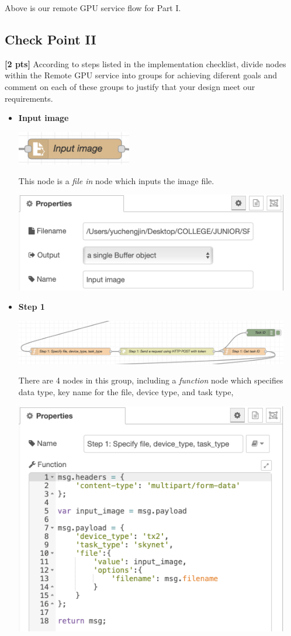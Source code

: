 \documentclass{mcmthesis}
\begin{document}
Above is our remote GPU service flow for Part I.

\subsection{Check Point II}
\textbf{[2 pts]} According to steps listed in the implementation checklist, divide nodes within the Remote GPU service into groups for achieving diferent goals and comment on each of these groups to justify that your design meet our requirements.
\begin{itemize}
\item \textbf{Input image}
\begin{center}
\includegraphics[width=5cm]{1.png}
\end{center}
This node is a \textit{file in} node which inputs the image file.
\begin{center}
\includegraphics[width=12cm]{1_1.png}
\end{center}
\item \textbf{Step 1}
\begin{center}
\includegraphics[width=12cm]{2.png}
\end{center}
There are 4 nodes in this group, including a \textit{function} node which specifies data type, key name for the file, device type, and task type,
\begin{center}
\includegraphics[width=12cm]{2_1.png}

\end{center}
\end{itemize}
\end{document}
